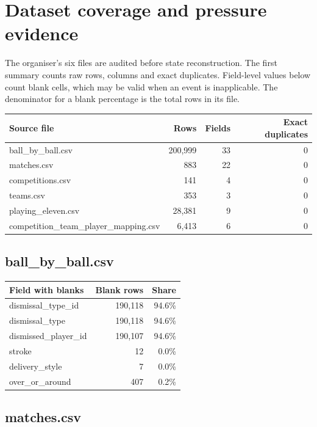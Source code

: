 \section{Dataset coverage and pressure evidence}

The organiser's six files are audited before state reconstruction. The first summary counts raw rows, columns and exact duplicates. Field-level values below count blank cells, which may be valid when an event is inapplicable. The denominator for a blank percentage is the total rows in its file.

\begin{center}
\begin{tabularx}{\linewidth}{>{\raggedright\arraybackslash}Xrrr}
\toprule
Source file & Rows & Fields & Exact duplicates \\
\midrule
ball\_by\_ball.csv & 200,999 & 33 & 0 \\
matches.csv & 883 & 22 & 0 \\
competitions.csv & 141 & 4 & 0 \\
teams.csv & 353 & 3 & 0 \\
playing\_eleven.csv & 28,381 & 9 & 0 \\
competition\_team\_player\_mapping.csv & 6,413 & 6 & 0 \\
\bottomrule
\end{tabularx}
\end{center}

\subsection*{ball\_by\_ball.csv}

\begin{center}
\begin{tabularx}{\linewidth}{>{\raggedright\arraybackslash}Xrr}
\toprule
Field with blanks & Blank rows & Share \\
\midrule
dismissal\_type\_id & 190,118 & 94.6\% \\
dismissal\_type & 190,118 & 94.6\% \\
dismissed\_player\_id & 190,107 & 94.6\% \\
stroke & 12 & 0.0\% \\
delivery\_style & 7 & 0.0\% \\
over\_or\_around & 407 & 0.2\% \\
\bottomrule
\end{tabularx}
\end{center}

\subsection*{matches.csv}

